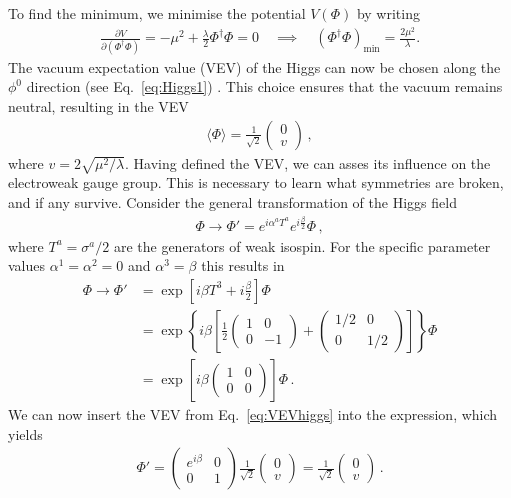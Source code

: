 To find the minimum, we minimise the potential $V(\Phi)$ by writing
\begin{align}
    \frac{\partial V}{\partial(\Phi^\dagger \Phi)} = -\mu^2 + \frac{\lambda}{2} \Phi^\dagger \Phi=0\quad \implies\quad (\Phi^\dagger \Phi)_{\min} = \frac{2\mu^2}{\lambda}.
\end{align}
The vacuum expectation value (VEV) of the Higgs can now be chosen along the $\phi^0$ direction (see Eq.~\eqref{eq:Higgs1}) \cite{Pernow:2021fvb}. This choice ensures that the vacuum remains neutral, resulting in the VEV
\begin{align}
    \langle \Phi \rangle = \frac{1}{\sqrt{2}}
    \begin{pmatrix}
        0\\v
    \end{pmatrix}\,,  \label{eq:VEVhiggs}
\end{align}
where $v=2\sqrt{\mu^2/\lambda}$.
Having defined the VEV, we can asses its influence on the electroweak gauge group. This is necessary to learn what symmetries are broken, and if any survive. Consider the general transformation of the Higgs field
\begin{align}
    \Phi \rightarrow \Phi' = e^{i\alpha^a T^a} e^{i\frac{\beta}{2}} \Phi\,,
\end{align}
where $T^a=\sigma^a/2$ are the generators of weak isospin. For the specific parameter values $\alpha^1=\alpha^2=0$ and $\alpha^3=\beta$ \cite{Peskin:1995ev} this results in
\begin{align}
\Phi \rightarrow \Phi'&=\exp \left[ i \beta T^3 + i \frac{\beta}{2} \right] \Phi \nonumber\\
&= \exp \left\{ i \beta \left[ \frac{1}{2} \begin{pmatrix} 1 & 0 \\ 0 & -1 \end{pmatrix} + \begin{pmatrix} 1/2 & 0 \\ 0 & 1/2 \end{pmatrix} \right] \right\} \Phi \nonumber\\
&= \exp \left[ i \beta \begin{pmatrix} 1 & 0 \\ 0 & 0 \end{pmatrix} \right] \Phi \,.
\end{align}
We can now insert the VEV from Eq.~\eqref{eq:VEVhiggs} into the expression, which yields
\begin{align}
    \Phi'= \begin{pmatrix} e^{i\beta} & 0 \\ 0 & 1 \end{pmatrix} \frac{1}{\sqrt{2}} \begin{pmatrix} 0 \\ v \end{pmatrix} = \frac{1}{\sqrt{2}} \begin{pmatrix} 0 \\ v \end{pmatrix}\,.\label{eq:VEVinvariant}
\end{align}
